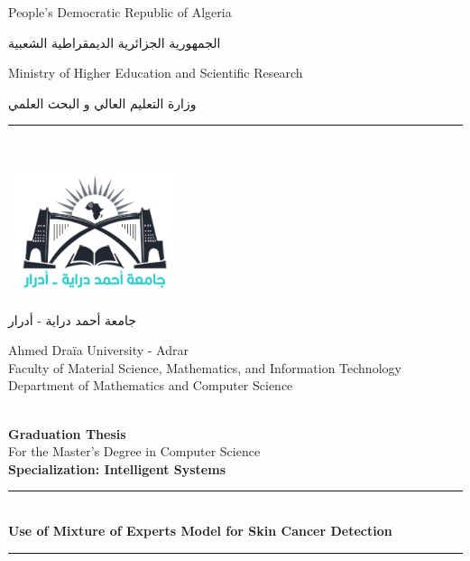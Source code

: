 \documentclass[a4paper,12pt]{report}
\begin{document}
	\begin{titlepage}
		\centering
		{\small People's Democratic Republic of Algeria}\\
		\begin{Arabic}		
			الجمهورية الجزائرية الديمقراطية الشعبية \\
		\end{Arabic}
		{\small Ministry of Higher Education and Scientific Research}\\
		\begin{Arabic}
			وزارة التعليم العالي و البحث العلمي \\
		\end{Arabic}
		\rule{\linewidth}{0.3mm} \\[0.4cm]
		
		\begin{minipage}{5cm}
			\begin{center}
				\includegraphics[width=5cm]{adrar_university_logo.png}
			\end{center}
		\end{minipage}\hfill
		\begin{minipage}{10cm}
			\begin{flushright}
				\begin{Arabic}
					جامعة أحمد دراية - أدرار \\
				\end{Arabic}
				{\small Ahmed Draïa University - Adrar}\\[0.1cm]
				{\small Faculty of Material Science, Mathematics, and Information Technology}\\[0.1cm]
				{\small Department of Mathematics and Computer Science}\\[0.1cm]
			\end{flushright}
		\end{minipage}\hfill\\
		\vspace{20mm}
		{\large \bfseries Graduation Thesis}\\[0.5cm]
		{\large For the Master's Degree in Computer Science}\\[0.5cm]
		{\large \bfseries{Specialization: Intelligent Systems} \\ }
		\vspace{10mm}
		\rule{\linewidth}{0.3mm} \\[0.4cm]
		{ \huge \bfseries Use of Mixture of Experts Model for Skin Cancer Detection\\[0.4cm] }
		\rule{\linewidth}{0.3mm} \\[1cm]
		\vspace{10mm}
		

\end{titlepage}
\end{document}
